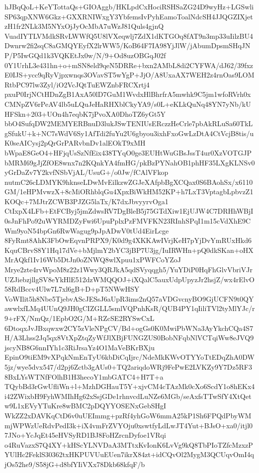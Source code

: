 \documentclass[multi=frame]{standalone}
\begin{document}
\begin{world}
        hJBqQoL+KeYTottaQs+GIOAggb/HKLpdCxHociRSHSaZG24D9wyHz+LGSwliSP63qpXNW6Gkz+GXXRNIWxgY3YbfemsIvPyhEamoToalNdcSH4JJQGZIXjetzH1fr2NLk3M5NYxOjJyOcMbA7uWzJ81Quls4gjnQ
        VuadIYTLVMdkSRvLWWfQ5U8lVXeqwlj7ZdX1dKTGOq8fAT9n3mp33uIilzBU4Dwnrw2fi2sqC8aGMQYEyfX2lrWW5/KoB64F7IA98YjJlW/jAbumDpsmSHqJNP/P5IwGQd1k3VQKEtJx0w/N/9+Od8uzOBGqJ02f
        0Y1UrhL3e431hn+o+mSN8eld9qeN5DRRe+bxn2AMbL8di2CYFWA/dJ62/39fxzE0IJS+ycc9qRyVjpxwnqs3OVavST5wYgP+JjO/A8UxaAX7WEH2z4rnOas9LOMRtbPC97lw3Zyl/iO2VcJQtTuEWZnbFRCXrtj4
        pxuP0IrjNCtHDnZgB1AxA50lD7GuM1WvdxHlBhrfrA5mwhk9C5jm1wfoRVrh0xCMNpZV6rPeAV4lb5uLQuJeHaRHXblCkyYA9/s0L+eKLkQuNq48YN7yNb/kUHFSkn+203+UOn4h7eqbK7jPvoXA0DhoTZ6yGt5Y
        bbO4SufqDW2MEMYERBnuD3lukJSwTENIUsERczzHeCrle7pbAkRLuSa60TkLgSfukU+k+NC7sWdV6Sy1AfTdi2fuYu2U6gbyou3ixhFxoGwLzDtA4CtVcjB8tis/uK0seAICysj2pQrGrPARvbnDv1alEOkT9xMH
        bWpaE8GeO4+HFjqUsSzNfEix438TYqO0ge3EUHtWuGBsJssT4ur0XzVOTGJPbMRM69gJjZfOE8wnx7n2KQnkYA4fmHG/pkBzPYNahOB1phHF35LXgKLNSv0yGrDaZv7Y2kvfNSbVjAL/UsuG+/o0Jw/fCAlVFkop
        nutmC26cLDMYK9hknseLDwMvEilkzwZGJeXAfpbBgXCQax0S6BAohSx/x6110GM/1eHPMvwzX+8cMiORhblqGu4XpxBiWkHM52KP+h7LxT3VptagbLpbvzZ1KOQc+7MJtrZCWB3PJZG5laTx/K7dxJbvyyrvOga1
        CtIxpX4LFb+EtFCByj5jmZdwsRV7DgBleB5j75GTdXiw1EjUJW4C7DRHhWBjI0sJnFhPo92uWYRMDZyFwi6UpuPplxPzFMVFKN23RInhSPqI1m15cVdXhE9CWm9yoN54bpGn6RwWagug9pJpADwV0tUd4EirLcge
        8FyRmt8AhK3FbOwEqvnPRPX9/K0d9g4XKKAwIVrjKeH7pYjDvYmRUxHkd6KquCBrvS8Y1Hq17dVe+bMjlmY2bYC3jBP7U3jg/IuIRWHn+pQ0dkSKan+oHXMrAQkf1Iv16Wb5DtJn0oZNWQ8wlXpuu1xPWFCoYZoJ
        Mrye2zte4rvWpoM8z22z1Wwy3QRJkA5qdSVyqqgh5/YuYDiP0HqFhGlvVbriVJrUZJiebzjllgSV8eYkHlE512dzWMQQOJ+iXQalC5auxUdpUpyzJr2hsjZ/wx4rElvO58RdBccv4Ulw7L7xl6gB+D+pT5NWwHSY
        VoWIlit5h8Nbe5TjebvAScJESsJ6aUpR3ims2nQ57aVDGvcnyBO9GjUCFN9t0QYawwlxfLMq4UUnQ9JH0gCIZGLL5smlVQPnhKsR/QUB4PY1qIiliTVl2tyMlYJc/r9+rFX/NmQz/1EpbO2G/M+RZcSE2RYSwCxL
        6DtoqxJvJBxqwxw2CY5zVleNPgCV/Bd+ogGs0K0MwiPbWNa3AyYkchCQa4S7H/A3Lhss2Jq5qx8VtXpZtqZyWfJlXBjFUNGZUS0BobNFqbNlVCTqiWw8eJVQ9jscyNB8G6nnIYh1c3RiJrsaYz4O1MaVeBKrBXju
        EpinO9tiEM9vXPqkNmEnTyU6kbDiCqIjrc/NdeMkKWvOTYYoTtEDqZhA0DW5jz/wye5dvx547/d2pj6Zctb3gAUs0+TQ2ariqdoWRj9FePwE2LVKZy9Y7Dz5RF38BxLYsWTNfFOlhB1H3hecoY1mbGATC4+H7T+a
        TQybBd3rGwUfliWn+l+MzhDGHauT5Y+xjvCM4cTAzMk0cXo6ScdY1o8hEKx4i42ZWixbH9FyhWMIhHg62xSsjGDe1rhnvcdLuNZe6MGb/seAxfsTTwSfY4XtQetw9L1xEVyYTuKre8wBMC2pDQYYOSENxGebSHgI
        WkZZ2xDAVKqCtD6v0uUEImmg+pzRf4yhGoW6mmA25kP1Sh6FPQdPbyWMmjWPWzUeRdvPedI3k+iX4vmFrZVYOju0xswtfyLdLwJT4Yut+BJsO+xa0/itjl07JNo+YcJqEt45eHVSyRD1BJ8FoHZrcnDyfoe1VRqi
        o4RuVazxS7Q4XY+kHScYLNVDaA3MTtxKvIonK6LvVg9kQ8TbPIoTZfcMzxzPYUlHc2FeklS30362txHKPUVUuEUen7ikrX84zt+idCQvOl2MygM3QCUqvOmI4qjOs52he9/S58jG+d8bfYIiVXx78Dkb68kfqF/b

\end{world}
\end{document}
